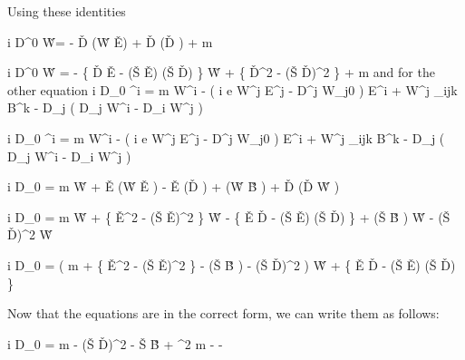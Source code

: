 Using these identities

\beq
	i D^0 \v{W}= - \v{D}   (\v{W} \cdot \v{E}) +  \v{D} (\v{D} \cdot \gv{\eta}) + m \gv{\eta}
\eeq

\beq
	i D^0 \v{W} = 
		- \{ \v{D} \cdot \v{E} - (\v{S} \cdot \v{E}) (\v{S} \cdot \v{D})	\} \v{W}
		+ \{ \v{D}^2 -  (\v{S} \cdot \v{D})^2 \} \gv{\eta} + m \gv{\eta}
\eeq
and for the other equation
\beq
	i D_0 \eta^i =  m W^i  -  \left( i e \lambda W^j E^j - D^j W_{j0} \right ) E^i
	+  W^j \epsilon_{ijk} B^k - D_j (  D_j W^i - D_i W^j )
\eeq

\beq
	i D_0 \eta^i =  m W^i  -  \left( i e \lambda W^j E^j - D^j W_{j0} \right ) E^i
	+  W^j \epsilon_{ijk} B^k - D_j (  D_j W^i - D_i W^j )
\eeq

\beq
	i D_0 \gv{\eta} = m \v{W} 
			+  \v{E} (\v{W} \cdot \v{E} )
			-  \v{E} (\v{D} \cdot \gv{\eta})
			+  (\v{W} \times \v{B} )
			+ \v{D} \times (\v{D} \times \v{W} ) 
\eeq

\beq
	i D_0 \gv{\eta} = m \v{W} 
			+  \{ \v{E}^2 - (\v{S} \cdot \v{E})^2 \} \v{W}
			- \{ \v{E} \cdot \v{D} - (\v{S} \cdot \v{E}) (\v{S} \cdot \v{D}) \} \gv{\eta}
			+  (\v{S} \cdot \v{B} ) \v{W}
			 -  (\v{S} \cdot \v{D})^2  \v{W}  
\eeq

\beq
	i D_0 \gv{\eta} = \left(
				m 
				+  \{ \v{E}^2 - (\v{S} \cdot \v{E})^2 \} 
				-  (\v{S} \cdot \v{B} )
				-  (\v{S} \cdot \v{D})^2 
			\right ) \v{W} 
			+ \{ \v{E} \cdot \v{D} - (\v{S} \cdot \v{E}) (\v{S} \cdot \v{D}) \} \gv{\eta}  
\eeq

Now that the equations are in the correct form, we can write them as follows:



\beq
i D_0  = 
	\Mblock
	{ \lambda {}  }
		{m
	- (\v{S} \cdot \v{D})^2 
	- \lambda {} \v{S} \cdot \v{B}
	+ \lambda^2    }
	{ m
	-   }
	{ - \lambda {}   }\eeq




